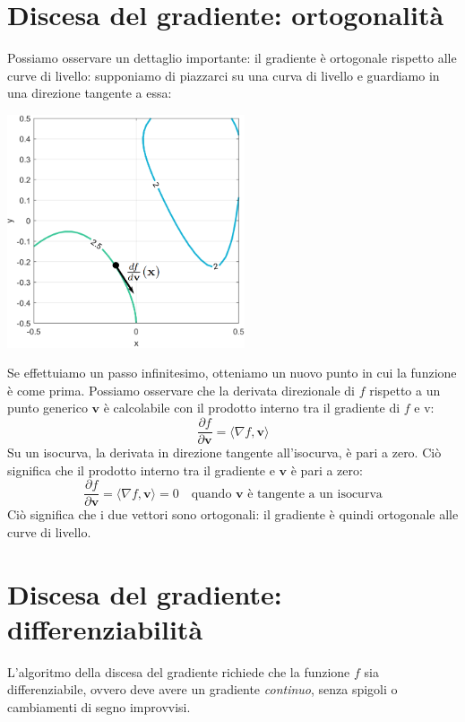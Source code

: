 \documentclass{article}
\begin{document}
    \section{Discesa del gradiente: ortogonalità}
        Possiamo osservare un dettaglio importante: il gradiente è ortogonale rispetto alle curve di livello: supponiamo 
        di piazzarci su una curva di livello e guardiamo in una direzione tangente a essa:
        \begin{center}\includegraphics[width=7cm]{grad_orthogonal.png}\end{center}
        Se effettuiamo un passo infinitesimo, otteniamo un nuovo punto in cui la funzione è come prima. Possiamo osservare 
        che la derivata direzionale di $f$ rispetto a un punto generico $\mathbf{v}$ è calcolabile con il prodotto interno tra il 
        gradiente di $f$ e v:
        \[\frac{\partial f}{\partial \mathbf{v}} = \langle \nabla f, \mathbf{v}\rangle \]
        Su un isocurva, la derivata in direzione tangente all'isocurva, è pari a zero. Ciò significa che il prodotto interno 
        tra il gradiente e $\mathbf{v}$ è pari a zero:
        \[\frac{\partial f}{\partial \mathbf{v}} = \langle \nabla f, \mathbf{v}\rangle = 0 \quad \text{quando $\mathbf{v}$ è tangente a un isocurva}\]
        Ciò significa che i due vettori sono ortogonali: il gradiente è quindi 
        ortogonale alle curve di livello. \\

    \section{Discesa del gradiente: differenziabilità}
        L'algoritmo della discesa del gradiente richiede che la funzione $f$ sia differenziabile, ovvero deve avere un 
        gradiente \emph{continuo}, senza spigoli o cambiamenti di segno improvvisi.
\end{document}
